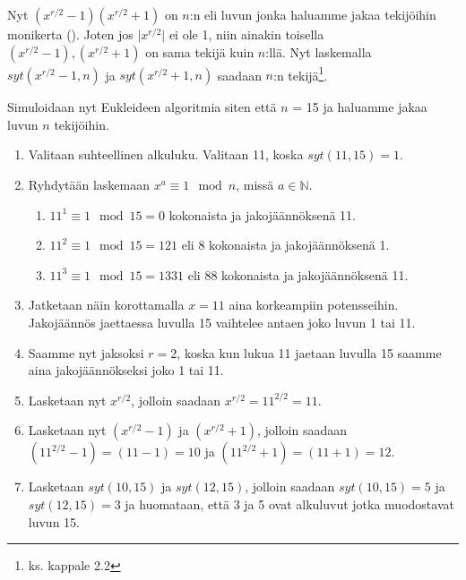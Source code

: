 Nyt $(x^{r/2} - 1)(x^{r/2} + 1)$ on $n$:n eli luvun jonka haluamme jakaa tekijöihin monikerta (\cite{hayward2008quantum}). Joten jos $\lvert x^{r/2} \rvert$ ei ole 1, niin ainakin toisella $(x^{r/2} - 1), (x^{r/2} + 1)$ on sama tekijä kuin $n$:llä. Nyt laskemalla $syt(x^{r/2} - 1, n)$ ja $syt(x^{r/2} + 1, n)$ saadaan $n$:n tekijä\footnote{ks. kappale 2.2}.

Simuloidaan nyt Eukleideen algoritmia siten että $n$ = 15 ja haluamme jakaa luvun $n$ tekijöihin.
\begin{enumerate}
    \item Valitaan suhteellinen alkuluku. Valitaan 11, koska $syt(11,15) = 1$.
    
    \item Ryhdytään laskemaan $x^{a} \equiv 1 \mod n$, missä $a \in \mathbb{N}$.
    
    \begin{enumerate}
    
        \item $11^{1} \equiv 1 \mod 15 = 0$ kokonaista ja jakojäännöksenä 11.
        
        \item $11^{2} \equiv 1 \mod 15 = 121$ eli 8 kokonaista ja jakojäännöksenä 1.
        
        \item $11^{3} \equiv 1 \mod 15 = 1331$ eli 88 kokonaista ja jakojäännöksenä 11.
    \end{enumerate}
    
    \item Jatketaan näin korottamalla $x = 11$ aina korkeampiin potensseihin. Jakojäännös jaettaessa luvulla 15 vaihtelee antaen joko luvun 1 tai 11.
    
    \item Saamme nyt jaksoksi $r = 2$, koska kun lukua 11 jaetaan luvulla 15 saamme aina jakojäännökseksi joko 1 tai 11.
    
    \item Lasketaan nyt $x^{r/2}$, jolloin saadaan $x^{r/2} = 11^{2/2} = 11$.
    
    \item Lasketaan nyt $(x^{r/2}-1)$ ja $(x^{r/2}+1)$, jolloin saadaan $(11^{2/2} - 1) = (11 - 1) = 10$ ja $(11^{2/2} + 1) = (11 + 1) = 12$.
    
    \item Lasketaan $syt(10,15)$ ja $syt(12,15)$, jolloin saadaan $syt(10,15) = 5$ ja $syt(12,15) = 3$ ja huomataan, että 3 ja 5 ovat alkuluvut jotka muodostavat luvun 15.
    
\end{enumerate}
\fi

